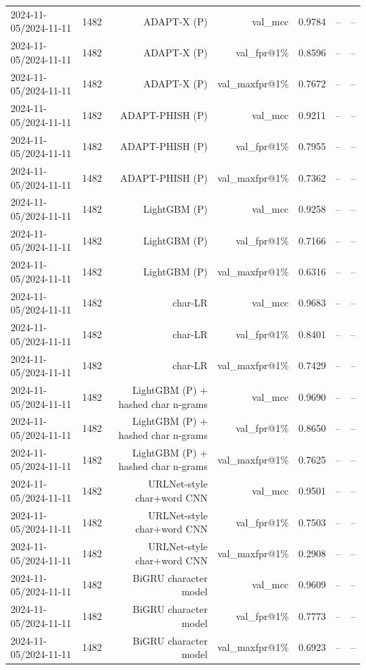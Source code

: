 \begin{table}[t]
\begin{tabular}{llrrrrr}
2024-11-05/2024-11-11 & 1482 & ADAPT-X (P) & val\_mcc & 0.9784 & -- & -- \\
2024-11-05/2024-11-11 & 1482 & ADAPT-X (P) & val\_fpr@1\% & 0.8596 & -- & -- \\
2024-11-05/2024-11-11 & 1482 & ADAPT-X (P) & val\_maxfpr@1\% & 0.7672 & -- & -- \\
2024-11-05/2024-11-11 & 1482 & ADAPT-PHISH (P) & val\_mcc & 0.9211 & -- & -- \\
2024-11-05/2024-11-11 & 1482 & ADAPT-PHISH (P) & val\_fpr@1\% & 0.7955 & -- & -- \\
2024-11-05/2024-11-11 & 1482 & ADAPT-PHISH (P) & val\_maxfpr@1\% & 0.7362 & -- & -- \\
2024-11-05/2024-11-11 & 1482 & LightGBM (P) & val\_mcc & 0.9258 & -- & -- \\
2024-11-05/2024-11-11 & 1482 & LightGBM (P) & val\_fpr@1\% & 0.7166 & -- & -- \\
2024-11-05/2024-11-11 & 1482 & LightGBM (P) & val\_maxfpr@1\% & 0.6316 & -- & -- \\
2024-11-05/2024-11-11 & 1482 & char-LR & val\_mcc & 0.9683 & -- & -- \\
2024-11-05/2024-11-11 & 1482 & char-LR & val\_fpr@1\% & 0.8401 & -- & -- \\
2024-11-05/2024-11-11 & 1482 & char-LR & val\_maxfpr@1\% & 0.7429 & -- & -- \\
2024-11-05/2024-11-11 & 1482 & LightGBM (P) + hashed char n-grams & val\_mcc & 0.9690 & -- & -- \\
2024-11-05/2024-11-11 & 1482 & LightGBM (P) + hashed char n-grams & val\_fpr@1\% & 0.8650 & -- & -- \\
2024-11-05/2024-11-11 & 1482 & LightGBM (P) + hashed char n-grams & val\_maxfpr@1\% & 0.7625 & -- & -- \\
2024-11-05/2024-11-11 & 1482 & URLNet-style char+word CNN & val\_mcc & 0.9501 & -- & -- \\
2024-11-05/2024-11-11 & 1482 & URLNet-style char+word CNN & val\_fpr@1\% & 0.7503 & -- & -- \\
2024-11-05/2024-11-11 & 1482 & URLNet-style char+word CNN & val\_maxfpr@1\% & 0.2908 & -- & -- \\
2024-11-05/2024-11-11 & 1482 & BiGRU character model & val\_mcc & 0.9609 & -- & -- \\
2024-11-05/2024-11-11 & 1482 & BiGRU character model & val\_fpr@1\% & 0.7773 & -- & -- \\
2024-11-05/2024-11-11 & 1482 & BiGRU character model & val\_maxfpr@1\% & 0.6923 & -- & -- \\

\end{tabular}
\end{table}
